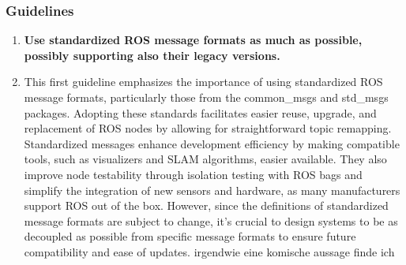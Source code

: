\documentclass[]{article}
\begin{document}
	\subsubsection{Guidelines}
	\begin{enumerate}[leftmargin=9mm, align=left]
		\item \textbf{Use standardized ROS message formats as much as possible, possibly supporting also their legacy versions.} 
		\item[]This first guideline emphasizes the importance of using standardized ROS message formats, particularly those from the common\_msgs and std\_msgs packages. Adopting these standards facilitates easier reuse, upgrade, and replacement of ROS nodes by allowing for straightforward topic remapping. Standardized messages enhance development efficiency by making compatible tools, such as visualizers and SLAM algorithms, easier available. They also improve node testability through isolation testing with ROS bags and simplify the integration of new sensors and hardware, as many manufacturers support ROS out of the box. However, since the definitions of standardized message formats are subject to change, it's crucial to design systems to be as decoupled as possible from specific message formats to ensure future compatibility and ease of updates. \autocite{malavoltaHowYouArchitect2020}{\color{red} irgendwie eine komische aussage finde ich}
		

\end{enumerate}
\end{document}
